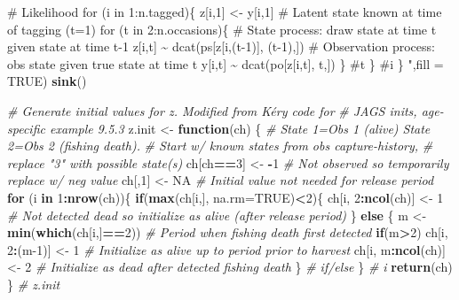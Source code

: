 \documentclass[
]{krantz}
\makeatletter
\newenvironment{Shaded}{\begin{snugshade}}{\end{snugshade}}
\newcommand{\AttributeTok}[1]{\textcolor[rgb]{0.27,0.27,0.27}{#1}}
\newcommand{\CommentTok}[1]{\textcolor[rgb]{0.37,0.37,0.37}{\textit{#1}}}
\newcommand{\ConstantTok}[1]{\textcolor[rgb]{0.37,0.37,0.37}{#1}}
\newcommand{\ControlFlowTok}[1]{\textcolor[rgb]{0.27,0.27,0.27}{\textbf{#1}}}
\newcommand{\DecValTok}[1]{\textcolor[rgb]{0.06,0.06,0.06}{#1}}
\newcommand{\FunctionTok}[1]{\textcolor[rgb]{0.27,0.27,0.27}{\textbf{#1}}}
\newcommand{\NormalTok}[1]{#1}
\newcommand{\OtherTok}[1]{\textcolor[rgb]{0.37,0.37,0.37}{#1}}
\newcommand{\SpecialCharTok}[1]{\textcolor[rgb]{0.43,0.43,0.43}{\textbf{#1}}}
\newcommand{\StringTok}[1]{\textcolor[rgb]{0.5,0.5,0.5}{#1}}
\newenvironment{kframe}{%
\medskip{}
\setlength{\fboxsep}{.8em}
 \def\at@end@of@kframe{}%
 \ifinner\ifhmode%
  \def\at@end@of@kframe{\end{minipage}}%
  \begin{minipage}{\columnwidth}%
 \fi\fi%
 \def\FrameCommand##1{\hskip\@totalleftmargin \hskip-\fboxsep
 \colorbox{shadecolor}{##1}\hskip-\fboxsep
     \hskip-\linewidth \hskip-\@totalleftmargin \hskip\columnwidth}%
 \MakeFramed {\advance\hsize-\width
   \@totalleftmargin\z@ \linewidth\hsize
   \@setminipage}}%
 {\par\unskip\endMakeFramed%
 \at@end@of@kframe}
\renewenvironment{Shaded}{\begin{kframe}}{\end{kframe}}
\makeatother
\begin{document}
\begin{Shaded}
\begin{Highlighting}[]
\StringTok{    \# Likelihood}
\StringTok{    for (i in 1:n.tagged)\{}
\StringTok{    z[i,1] \textless{}{-} y[i,1] \# Latent state known at time of tagging (t=1)}
\StringTok{    for (t in 2:n.occasions)\{}
\StringTok{    \# State process: draw state at time t given state at time t{-}1}
\StringTok{    z[i,t] \textasciitilde{} dcat(ps[z[i,(t{-}1)], (t{-}1),])}
\StringTok{    \# Observation process: obs state given true state at time t}
\StringTok{    y[i,t] \textasciitilde{} dcat(po[z[i,t], t,])}
\StringTok{    \} \#t}
\StringTok{    \} \#i}
\StringTok{\}}
\StringTok{    "}\NormalTok{,}\AttributeTok{fill =} \ConstantTok{TRUE}\NormalTok{)}
\FunctionTok{sink}\NormalTok{()}

\CommentTok{\# Generate initial values for z. Modified from Kéry code for}
\CommentTok{\# JAGS inits, age{-}specific example 9.5.3}
\NormalTok{z.init }\OtherTok{\textless{}{-}} \ControlFlowTok{function}\NormalTok{(ch) \{}
  \CommentTok{\# State 1=Obs 1 (alive) State 2=Obs 2 (fishing death). }
  \CommentTok{\# Start w/ known states from obs capture{-}history,}
  \CommentTok{\# replace "3" with possible state(s)}
\NormalTok{  ch[ch}\SpecialCharTok{==}\DecValTok{3}\NormalTok{] }\OtherTok{\textless{}{-}} \SpecialCharTok{{-}}\DecValTok{1}  \CommentTok{\# Not observed so temporarily replace w/ neg value}
\NormalTok{  ch[,}\DecValTok{1}\NormalTok{] }\OtherTok{\textless{}{-}} \ConstantTok{NA}  \CommentTok{\# Initial value not needed for release period}
  \ControlFlowTok{for}\NormalTok{ (i }\ControlFlowTok{in} \DecValTok{1}\SpecialCharTok{:}\FunctionTok{nrow}\NormalTok{(ch))\{}
    \ControlFlowTok{if}\NormalTok{(}\FunctionTok{max}\NormalTok{(ch[i,], }\AttributeTok{na.rm=}\ConstantTok{TRUE}\NormalTok{)}\SpecialCharTok{\textless{}}\DecValTok{2}\NormalTok{)\{}
\NormalTok{      ch[i, }\DecValTok{2}\SpecialCharTok{:}\FunctionTok{ncol}\NormalTok{(ch)] }\OtherTok{\textless{}{-}} \DecValTok{1} 
      \CommentTok{\# Not detected dead so initialize as alive (after release period)}
\NormalTok{      \} }\ControlFlowTok{else}\NormalTok{ \{}
\NormalTok{      m }\OtherTok{\textless{}{-}} \FunctionTok{min}\NormalTok{(}\FunctionTok{which}\NormalTok{(ch[i,]}\SpecialCharTok{==}\DecValTok{2}\NormalTok{))  }
        \CommentTok{\# Period when fishing death first detected}
      \ControlFlowTok{if}\NormalTok{(m}\SpecialCharTok{\textgreater{}}\DecValTok{2}\NormalTok{) ch[i, }\DecValTok{2}\SpecialCharTok{:}\NormalTok{(m}\DecValTok{{-}1}\NormalTok{)] }\OtherTok{\textless{}{-}} \DecValTok{1}  
      \CommentTok{\# Initialize as alive up to period prior to harvest}
\NormalTok{      ch[i, m}\SpecialCharTok{:}\FunctionTok{ncol}\NormalTok{(ch)] }\OtherTok{\textless{}{-}} \DecValTok{2}  
        \CommentTok{\# Initialize as dead after detected fishing death}
\NormalTok{      \} }\CommentTok{\# if/else}
\NormalTok{\} }\CommentTok{\# i}
  \FunctionTok{return}\NormalTok{(ch)}
\NormalTok{\} }\CommentTok{\# z.init}


\end{Highlighting}
\end{Shaded}
\end{document}

